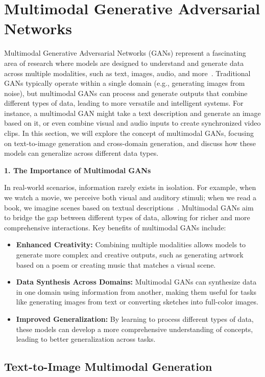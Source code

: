 \section{Multimodal Generative Adversarial Networks}

Multimodal Generative Adversarial Networks (GANs) represent a fascinating area of research where models are designed to understand and generate data across multiple modalities, such as text, images, audio, and more~\cite{liu2019multi}. Traditional GANs typically operate within a single domain (e.g., generating images from noise), but multimodal GANs can process and generate outputs that combine different types of data, leading to more versatile and intelligent systems. For instance, a multimodal GAN might take a text description and generate an image based on it, or even combine visual and audio inputs to create synchronized video clips. In this section, we will explore the concept of multimodal GANs, focusing on text-to-image generation and cross-domain generation, and discuss how these models can generalize across different data types.

\textbf{1. The Importance of Multimodal GANs}

In real-world scenarios, information rarely exists in isolation. For example, when we watch a movie, we perceive both visual and auditory stimuli; when we read a book, we imagine scenes based on textual descriptions~\cite{scholl2011challenges}. Multimodal GANs aim to bridge the gap between different types of data, allowing for richer and more comprehensive interactions. Key benefits of multimodal GANs include:
\begin{itemize}
    \item \textbf{Enhanced Creativity:} Combining multiple modalities allows models to generate more complex and creative outputs, such as generating artwork based on a poem or creating music that matches a visual scene.
    \item \textbf{Data Synthesis Across Domains:} Multimodal GANs can synthesize data in one domain using information from another, making them useful for tasks like generating images from text or converting sketches into full-color images.
    \item \textbf{Improved Generalization:} By learning to process different types of data, these models can develop a more comprehensive understanding of concepts, leading to better generalization across tasks.
\end{itemize}

\subsection{Text-to-Image Multimodal Generation}


